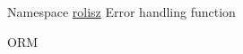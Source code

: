\label{todo__todo000001}
\hypertarget{todo__todo000001}{}
 
\begin{DoxyDescription}
\item[Namespace \hyperlink{namespacerolisz}{rolisz} ]Error handling function 

ORM 
\end{DoxyDescription}
